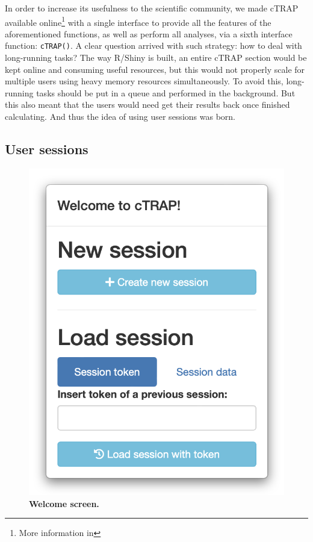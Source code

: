 In order to increase its usefulness to the scientific community, we made cTRAP available online\footnote{More information in } with a single interface to provide all the features of the aforementioned functions, as well as perform all analyses, via a sixth interface function: \texttt{cTRAP()}. A clear question arrived with such strategy: how to deal with long-running tasks? The way R/Shiny is built, an entire cTRAP section would be kept online and consuming useful resources, but this would not properly scale for multiple users using heavy memory resources simultaneously. To avoid this, long-running tasks should be put in a queue and performed in the background. But this also meant that the users would need get their results back once finished calculating. And thus the idea of using user sessions was born.

\subsection{User sessions}
\label{sec:ctrap-web}

\begin{figure}
  \vspace{-\intextsep}
  \includegraphics[width=\linewidth]{images/ctrap/welcome}
  \caption[Welcome screen modal]{\textbf{Welcome screen.}}
  \vspace{-\intextsep}
  \label{fig:ctrap-welcome}
\end{figure}

